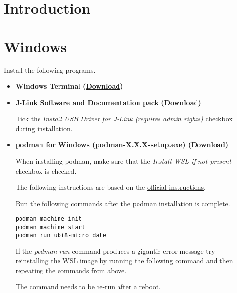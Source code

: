 



\puttitle{}

\section{Introduction}

\newpage

\section{Windows}

Install the following programs.

\begin{itemize}
  \item \textbf{Windows Terminal (\href{https://aka.ms/terminal}{Download})}
  \item \textbf{J-Link Software and Documentation pack
          (\href{https://www.segger.com/downloads/jlink/JLink_Windows_x86_64.exe}{Download})}

        Tick the \emph{Install USB Driver for J-Link (requires admin rights)} checkbox
        during installation.
  \item \textbf{podman for Windows (podman-X.X.X-setup.exe)
          (\href{https://github.com/containers/podman/releases}{Download})}

        When installing podman, make sure that the \emph{Install WSL if not present} checkbox is checked.

        The following instructions are based on the
        \href{https://github.com/containers/podman/blob/main/docs/tutorials/podman-for-windows.md}
        {official
          instructions}.

        Run the following commands after the podman installation is complete.

        \begin{lstlisting}
podman machine init
podman machine start
podman run ubi8-micro date
       \end{lstlisting}

        \begin{infobox}
          If the \emph{podman run} command produces a gigantic error message try
          reinstalling the WSL image by running the following command and then
          repeating the commands from above.

        \end{infobox}
        \begin{infobox}
          The  command needs to be re-run after a reboot.
        \end{infobox}
\end{itemize}

